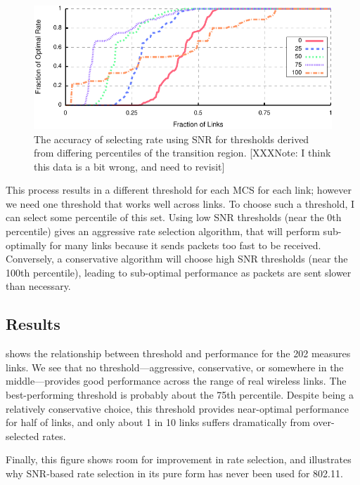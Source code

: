 \begin{figure}[ht]
	\centering
	\includegraphics[width=\textwidth]{figures/thresh_vs_opt.pdf}
	\caption[The accuracy of selecting rate using SNR for thresholds derived from differing percentiles of the transition region.]{\label{fig:thresh_vs_opt}The accuracy of selecting rate using SNR for thresholds derived from differing percentiles of the transition region. [XXXNote: I think this data is a bit wrong, and need to revisit]}
\end{figure}

This process results in a different threshold for each MCS for each link; however we need one threshold that works well across links. To choose such a threshold, I can select some percentile of this set. Using low SNR thresholds (near the 0th percentile) gives an aggressive rate selection algorithm, that will perform sub-optimally for many links because it sends packets too fast to be received. Conversely, a conservative algorithm will choose high SNR thresholds (near the 100th percentile), leading to sub-optimal performance as packets are sent slower than necessary.

\subsection{Results}
 shows the relationship between threshold and performance for the 202 measures links. We see that no threshold---aggressive, conservative, or somewhere in the middle---provides good performance across the range of real wireless links. The best-performing threshold is probably about the 75th percentile. Despite being a relatively conservative choice, this threshold provides near-optimal performance for half of links, and only about 1 in 10 links suffers dramatically from over-selected rates.

Finally, this figure shows room for improvement in rate selection, and illustrates why SNR-based rate selection in its pure form has never been used for 802.11. 

